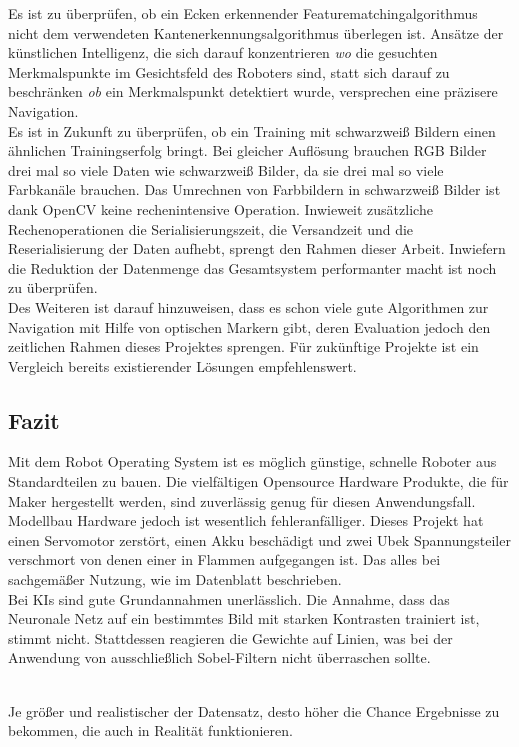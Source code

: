 \documentclass[conference]{IEEEtran}
\begin{document}
	Es ist zu überprüfen, ob ein Ecken erkennender Featurematchingalgorithmus nicht dem verwendeten Kantenerkennungsalgorithmus überlegen ist. Ansätze der künstlichen Intelligenz, die sich darauf konzentrieren \textit{wo} die gesuchten Merkmalspunkte im Gesichtsfeld des Roboters sind, statt sich darauf zu beschränken \textit{ob} ein Merkmalspunkt detektiert wurde, versprechen eine präzisere Navigation. \\
	Es ist in Zukunft zu überprüfen, ob ein Training mit schwarzweiß Bildern einen ähnlichen Trainingserfolg bringt. Bei gleicher Auflösung brauchen RGB Bilder drei mal so viele Daten wie schwarzweiß Bilder, da sie drei mal so viele Farbkanäle brauchen. Das Umrechnen von Farbbildern in schwarzweiß Bilder ist dank OpenCV keine rechenintensive Operation. Inwieweit zusätzliche Rechenoperationen die Serialisierungszeit, die Versandzeit und die Reserialisierung der Daten aufhebt, sprengt den Rahmen dieser Arbeit. Inwiefern die Reduktion der Datenmenge das Gesamtsystem performanter macht ist noch zu überprüfen.
	\\
	Des Weiteren ist darauf hinzuweisen, dass es schon viele gute Algorithmen zur Navigation mit Hilfe von optischen Markern gibt, deren Evaluation jedoch den zeitlichen Rahmen dieses Projektes sprengen. Für zukünftige Projekte ist ein Vergleich bereits existierender Lösungen empfehlenswert.
		
	\subsection{Fazit}

Mit dem Robot Operating System ist es möglich günstige, schnelle Roboter 
aus Standardteilen zu bauen. Die vielfältigen Opensource Hardware 
Produkte, die für Maker hergestellt werden, sind zuverlässig genug für diesen 
Anwendungsfall. Modellbau Hardware jedoch ist wesentlich fehleranfälliger. 
Dieses Projekt hat einen Servomotor zerstört, einen Akku beschädigt und 
zwei Ubek Spannungsteiler verschmort von denen einer in Flammen 
aufgegangen ist. Das alles bei sachgemäßer Nutzung, wie im Datenblatt 
beschrieben.\\

Bei KIs sind gute Grundannahmen unerlässlich. Die Annahme, dass das
Neuronale Netz auf ein bestimmtes Bild mit starken Kontrasten trainiert ist, 
stimmt nicht. Stattdessen reagieren die Gewichte auf Linien, was bei der 
Anwendung von ausschließlich Sobel-Filtern nicht überraschen sollte.

\\
Je größer und realistischer der Datensatz, desto höher die Chance 
Ergebnisse zu bekommen, die auch in Realität funktionieren.   \\
\end{document}
